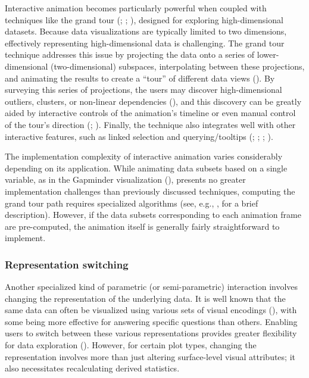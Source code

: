 \documentclass[
]{book}
\theoremstyle{definition}
\theoremstyle{definition}
\theoremstyle{definition}
\theoremstyle{definition}
\theoremstyle{remark}
\begin{document}
Interactive animation becomes particularly powerful when coupled with techniques like the grand tour (; ; ), designed for exploring high-dimensional datasets. Because data visualizations are typically limited to two dimensions, effectively representing high-dimensional data is challenging. The grand tour technique addresses this issue by projecting the data onto a series of lower-dimensional (two-dimensional) subspaces, interpolating between these projections, and animating the results to create a ``tour'' of different data views (). By surveying this series of projections, the users may discover high-dimensional outliers, clusters, or non-linear dependencies (), and this discovery can be greatly aided by interactive controls of the animation's timeline or even manual control of the tour's direction (; ). Finally, the technique also integrates well with other interactive features, such as linked selection and querying/tooltips (; ; ; ).

The implementation complexity of interactive animation varies considerably depending on its application. While animating data subsets based on a single variable, as in the Gapminder visualization (), presents no greater implementation challenges than previously discussed techniques, computing the grand tour path requires specialized algorithms (see, e.g., , for a brief description). However, if the data subsets corresponding to each animation frame are pre-computed, the animation itself is generally fairly straightforward to implement.

\subsubsection{Representation switching}\label{representation-switching}

Another specialized kind of parametric (or semi-parametric) interaction involves changing the representation of the underlying data. It is well known that the same data can often be visualized using various sets of visual encodings (), with some being more effective for answering specific questions than others. Enabling users to switch between these various representations provides greater flexibility for data exploration (). However, for certain plot types, changing the representation involves more than just altering surface-level visual attributes; it also necessitates recalculating derived statistics.
\end{document}
